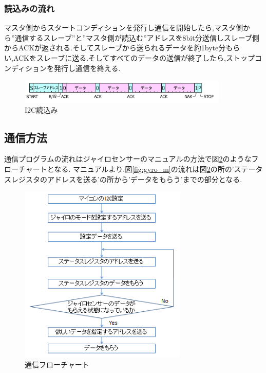 \documentclass[12pt,oneside]{paper}
\begin{document}
\subsubsection{読込みの流れ}

マスタ側からスタートコンディションを発行し通信を開始したら,マスタ側から''通信するスレーブ''と''マスタ側が読込む''アドレスを8bit分送信しスレーブ側からACKが返される.そしてスレーブから送られるデータを約1byte分もらい,ACKをスレーブに送る.そしてすべてのデータの送信が終了したら,ストップコンディションを発行し通信を終える.

\begin{figure}[H]
  \begin{center}
    \includegraphics[width=100mm]{ga/i2c_r.png}
    \end{center}
  \caption{I2C読込み}
 \label{fig:i2c_r}
\end{figure}

\subsection{通信方法}通信プログラムの流れはジャイロセンサーのマニュアルの方法で図\ref{fig:flo}のようなフローチャートとなる.
マニュアルより,図\ref{fig:gyro_m}の流れは図\ref{fig:flo}の所の'ステータスレジスタのアドレスを送る'の所から'データをもらう'までの部分となる.

\begin{figure}[H]
  \begin{center}
    \includegraphics[width=80mm]{ga/flo.png}
    \end{center}
  \caption{通信フローチャート}
 \label{fig:flo}
\end{figure}
\end{document}
